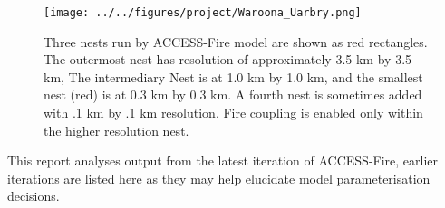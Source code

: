     \begin{figure}
      \texttt{[image: ../../figures/project/Waroona\_Uarbry.png]}
      \caption{Three nests run by ACCESS-Fire model are shown as red rectangles. 
      The outermost nest has resolution of approximately 3.5 km by 3.5 km, 
      The intermediary Nest is at 1.0 km by 1.0 km, and the smallest nest (red) is at 0.3 km by 0.3 km.
      A fourth nest is sometimes added 
      with .1 km by .1 km resolution.
      Fire coupling is enabled only within the higher resolution nest.}
      \label{fig:model:nests}
    \end{figure}
    
    This report analyses output from the latest iteration of ACCESS-Fire, earlier iterations are listed here as they may help elucidate model parameterisation decisions. 
